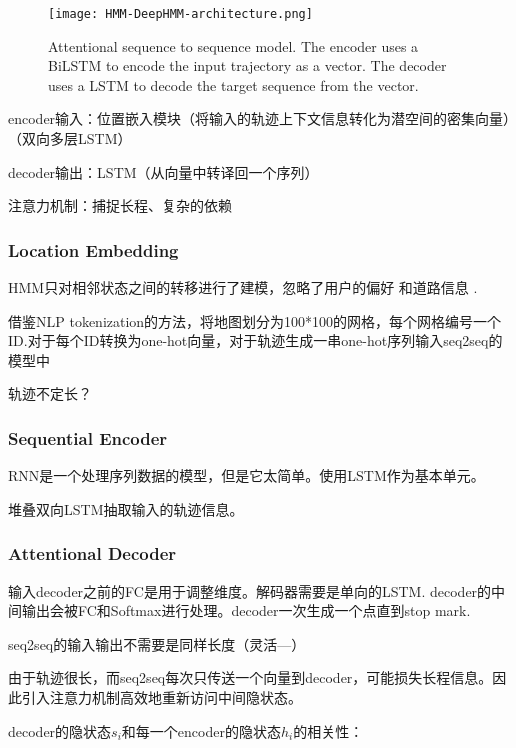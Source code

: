 \begin{figure}[htbp]
    \caption{Attentional sequence to sequence model. The encoder uses a
    BiLSTM to encode the input trajectory as a vector. The decoder uses a
    LSTM to decode the target sequence from the vector.}
    \centering
    \texttt{[image: HMM-DeepHMM-architecture.png]}
\end{figure}

encoder输入：位置嵌入模块（将输入的轨迹上下文信息转化为潜空间的密集向量）（双向多层LSTM）

decoder输出：LSTM（从向量中转译回一个序列）

注意力机制：捕捉长程、复杂的依赖

\subsubsection{Location Embedding}

HMM只对相邻状态之间的转移进行了建模，忽略了用户的偏好 \cite{Jagadeesh2017} 和道路信息 \cite{Hu2017a}.

借鉴NLP tokenization的方法，将地图划分为100*100的网格，每个网格编号一个ID.对于每个ID转换为one-hot向量，对于轨迹生成一串one-hot序列输入seq2seq的模型中

\begin{remark}
    轨迹不定长？
\end{remark}

\subsubsection{Sequential Encoder}

RNN是一个处理序列数据的模型，但是它太简单。使用LSTM作为基本单元。

堆叠双向LSTM抽取输入的轨迹信息。

\subsubsection{Attentional Decoder}

输入decoder之前的FC是用于调整维度。解码器需要是单向的LSTM. decoder的中间输出会被FC和Softmax进行处理。decoder一次生成一个点直到stop mark.

seq2seq的输入输出不需要是同样长度（灵活—）

由于轨迹很长，而seq2seq每次只传送一个向量到decoder，可能损失长程信息。因此引入注意力机制高效地重新访问中间隐状态。

decoder的隐状态$s_i$和每一个encoder的隐状态$h_i$的相关性：

